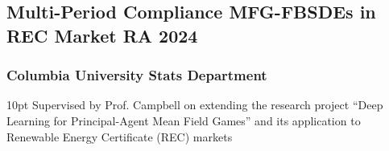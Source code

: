 \documentclass[a4paper]{article}
\begin{document}
\hypertarget{FBSDEs}{
    \subsection{Multi-Period Compliance MFG-FBSDEs in REC Market \normalfont \hfill RA \hfill 2024}}
    
\subsubsection{Columbia University Stats Department}
\vspace{3pt}
\begin{adjustwidth}{10pt}{}
    Supervised by Prof. Campbell on extending the research project “Deep Learning for Principal-Agent Mean Field Games” and its application to Renewable Energy Certificate (REC) markets
\end{adjustwidth}
\end{document}
